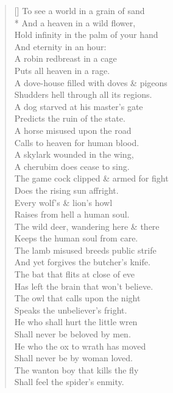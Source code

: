 \documentclass[MAIN]{subfiles}
\begin{document}
\settowidth{\versewidth}{A dove-house filled with doves \& pigeons}
\begin{verse}[\versewidth]
To see a world in a grain of sand\\*
And a heaven in a wild flower,\\
Hold infinity in the palm of your hand\\
And eternity in an hour:\\
A robin redbreast in a cage\\
Puts all heaven in a rage.\\
A dove-house filled with doves \& pigeons\\
Shudders hell through all its regions.\\
A dog starved at his master's gate\\
Predicts the ruin of the state.\\
A horse misused upon the road\\
Calls to heaven for human blood.\\
A skylark wounded in the wing,\\
A cherubim does cease to sing.\\
The game cock clipped \& armed for fight\\
Does the rising sun affright.\\
Every wolf's \& lion's howl\\
Raises from hell a human soul.\\
The wild deer, wandering here \& there\\
Keeps the human soul from care.\\
The lamb misused breeds public strife\\
And yet forgives the butcher's knife.\\
The bat that flits at close of eve\\
Has left the brain that won't believe.\\
The owl that calls upon the night\\
Speaks the unbeliever's fright.\\
He who shall hurt the little wren\\
Shall never be beloved by men.\\
He who the ox to wrath has moved\\
Shall never be by woman loved.\\
The wanton boy that kills the fly\\
Shall feel the spider's enmity.\\

\end{verse}
\end{document}
